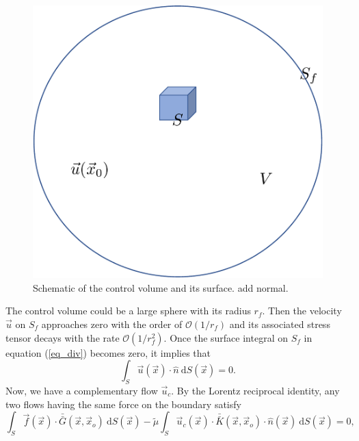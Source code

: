 \begin{figure}[h]
	\begin{center}
		\includegraphics[scale=0.4]{./figures/fig_dlp_volume}
		\vspace{0.5cm}
	\caption{Schematic of the control volume and its surface. {\color{red} add normal.}}
	\label{fig_dlp_volume}
\end{center}
\end{figure}
The control volume could be a large sphere with its radius $r_f$. Then the velocity $\vec{u}$ on $S_f$ approaches zero with the order of $\mathcal{O}(1/r_f)$ and its associated stress tensor decays with the rate $\mathcal{O} (1/r_f^2)$. Once the surface integral on $S_f$ in equation (\ref{eq_div}) becomes zero, it implies that
\[
\int_{S} \vec{u}(\vec{x}) \cdot \hat{n} \ \text{d}S(\vec{x}) = 0.
\]
Now, we have a complementary flow $\vec{u}_c$.  By the Lorentz reciprocal identity, any two flows having the same force on the boundary satisfy
\begin{equation}
	\int_{S}  \vec{f}(\vec{x}) \cdot \bar{\bar{G}}(\vec{x},\vec{x}_o) \ \text{d}S(\vec{x})  
	- \tilde{\mu} \int_S
	  \vec{u}_c(\vec{x}) \cdot  \bar{\bar{K}}(\vec{x},\vec{x}_o) 
	  \cdot \hat{n} ( \vec{x})
	  \ \text{d}S(\vec{x})
	  =0,
	  \label{eq_comple_identity}
\end{equation}
